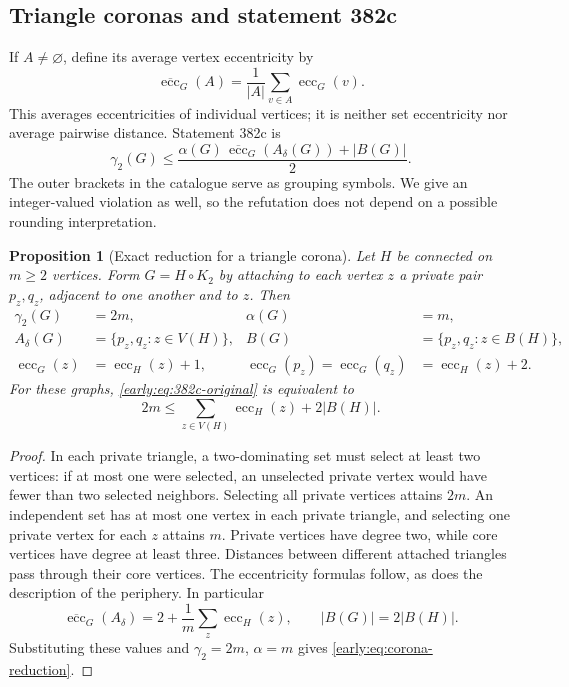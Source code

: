 \documentclass[11pt,a4paper]{article}
\newtheorem{proposition}[theorem]{Proposition}
\theoremstyle{definition}\newtheorem{definition}[theorem]{Definition}
\theoremstyle{remark}\newtheorem{remark}[theorem]{Remark}
\begin{document}
\subsection{Triangle coronas and statement 382c}

If $A\ne\varnothing$, define its average vertex eccentricity by
\[
 \overline{\operatorname{ecc}}_G(A)
 =\frac{1}{|A|}\sum_{v\in A}\operatorname{ecc}_G(v).
\]
This averages eccentricities of individual vertices; it is neither
set eccentricity nor average pairwise distance.  Statement 382c is
\begin{equation}
 \gamma_2(G)\leq
 \frac{\alpha(G)\,\overline{\operatorname{ecc}}_G(A_\delta(G))
       +|B(G)|}{2}.
 \label{early:eq:382c-original}
\end{equation}
The outer brackets in the catalogue serve as grouping symbols.  We give
an integer-valued violation as well, so the refutation does not depend
on a possible rounding interpretation.

\begin{proposition}[Exact reduction for a triangle corona]
\label{early:prop:triangle-corona}
Let $H$ be connected on $m\geq2$ vertices.  Form $G=H\circ K_2$ by
attaching to each vertex $z$ a private pair $p_z,q_z$, adjacent to one
another and to $z$.  Then
\begin{align*}
 \gamma_2(G)&=2m,&\alpha(G)&=m,\\
 A_\delta(G)&=\{p_z,q_z:z\in V(H)\},&
 B(G)&=\{p_z,q_z:z\in B(H)\},\\
 \operatorname{ecc}_G(z)&=\operatorname{ecc}_H(z)+1,&
 \operatorname{ecc}_G(p_z)=\operatorname{ecc}_G(q_z)
 &=\operatorname{ecc}_H(z)+2.
\end{align*}
For these graphs, \eqref{early:eq:382c-original} is equivalent to
\begin{equation}
 2m\leq\sum_{z\in V(H)}\operatorname{ecc}_H(z)+2|B(H)|.
 \label{early:eq:corona-reduction}
\end{equation}
\end{proposition}
\begin{proof}
In each private triangle, a two-dominating set must select at least two
vertices: if at most one were selected, an unselected private vertex
would have fewer than two selected neighbors.  Selecting all private
vertices attains $2m$.  An independent set has at most one vertex in
each private triangle, and selecting one private vertex for each $z$
attains $m$.  Private vertices have degree two, while core vertices
have degree at least three.  Distances between different attached
triangles pass through their core vertices.  The eccentricity formulas
follow, as does the description of the periphery.  In particular
\[
 \overline{\operatorname{ecc}}_G(A_\delta)
 =2+\frac1m\sum_z\operatorname{ecc}_H(z),\qquad
 |B(G)|=2|B(H)|.
\]
Substituting these values and $\gamma_2=2m$, $\alpha=m$ gives
\eqref{early:eq:corona-reduction}.
\end{proof}
\end{document}
